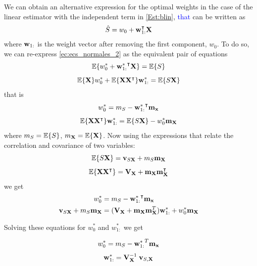 We can obtain an alternative expression for the optimal weights in the case of the linear estimator with the independent term in \eqref{Est:blin}, \textcolor{blue}{that} can be written as
\begin{align}
\hat S = w_0 + {\bf w}_{1:}^\intercal {\bf X}
\end{align}
where ${\bf w}_{1:}$ is the weight vector after removing the first component, $w_0$. To do so, we can re-express \eqref{ec:ecs_normales_2} as the equivalent pair of equations
\begin{equation}
\label{Est:E0}
\mathbb{E}\{w_0^* + {{\bf w}_{1:}^*}^\intercal {\bf X} \} = \mathbb{E}\{S\}
\end{equation}
\begin{equation}
\label{Est:Ex}
\mathbb{E}\{{\bf X}\} w_0^* + \mathbb{E}\{{\bf X}{\bf X}^\intercal\}{\bf w}_{1:}^* = \mathbb{E}\{S{\bf X}\}
\end{equation}
that is
\begin{equation}
w_0^* = m_S - {{\bf w}_{1:}^*}^\intercal{\bf m_x}
\end{equation}
\begin{align}
\label{Est:PrincipioOrtV2b}
\mathbb{E}\{{\bf X} {\bf X}^\intercal \}{\bf w}_{1:}^* = \mathbb{E}\{S {\bf X}\} - w_0^* {\bf m_X}  
\end{align}
where $m_S=\mathbb{E}\{S\}$, $m_{\bf X} =\mathbb{E}\{{\bf X}\}$. Now using the expressions that relate the correlation and covariance of two variables:
\begin{equation}
\mathbb{E}\{S {\bf X}\} = {\bf v}_{S{\bf X}} + m_S {\bf m_X}
\end{equation}
\begin{equation}
\mathbb{E}\{{\bf X}{\bf X}^\intercal\} = {\bf V_X} + {\bf m_X}{\bf m}_{\bf X}^\intercal
\end{equation}
we get 
\begin{align}
w_0^* &= m_S  - {{\bf w}_{1:}^*}^\intercal{\bf m_x}  \\
\label{Est:PrincipioOrtV2c}
{\bf v}_{S{\bf X}} + m_S {\bf m_X} 
	&= ({\bf V_X} + {\bf m_X}{\bf m}_{\bf X}^T){\bf w}_{1:}^* + w_0^* {\bf m_X}  
\end{align}

{Solving these equations for $w_0^*$ and $w_{1:}^*$ we get
\begin{framed}
\begin{equation}
w_0^* = m_S - {{\bf w}_{1:}^*}^T{\bf m_x} 
\label{ec:solucionw0}
\end{equation}
\begin{equation}
\label{ec:solucionw}
{\bf w}_{1:}^* = {{\bf V}_{\bf X}^{-1}} \; {\bf v}_{S,{\bf X}}\end{equation}
\end{framed}}

